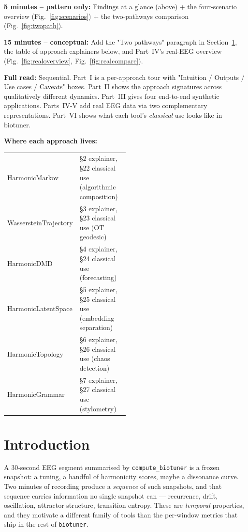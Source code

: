 \documentclass[11pt,a4paper]{article}
\begin{document}
\begin{tcolorbox}[enhanced, breakable, colback=black!4, colframe=black!30,
                  sharp corners, fonttitle=\bfseries, title={Reading paths},
                  before skip=4pt, after skip=4pt]
\textbf{5 minutes -- pattern only:}  Findings at a glance (above) +
the four-scenario overview (Fig.~\ref{fig:scenarios}) +
the two-pathways comparison (Fig.~\ref{fig:twopath}).

\medskip
\textbf{15 minutes -- conceptual:}  Add the "Two pathways" paragraph
in Section~\ref{sec:intro}, the table of approach explainers below,
and Part~IV's real-EEG overview
(Fig.~\ref{fig:realoverview}, Fig.~\ref{fig:realcompare}).

\medskip
\textbf{Full read:}  Sequential. Part~I is a per-approach tour with
"Intuition / Outputs / Use cases / Caveats" boxes. Part~II shows the
approach signatures across qualitatively different dynamics. Part~III
gives four end-to-end synthetic applications. Parts~IV-V add real
EEG data via two complementary representations. Part~VI shows what
each tool's \emph{classical} use looks like in biotuner.

\medskip
\textbf{Where each approach lives:}
\begin{tabular}{@{}lp{0.5\linewidth}@{}}
HarmonicMarkov & \S2 explainer, \S22 classical use (algorithmic composition) \\
WassersteinTrajectory & \S3 explainer, \S23 classical use (OT geodesic) \\
HarmonicDMD & \S4 explainer, \S24 classical use (forecasting) \\
HarmonicLatentSpace & \S5 explainer, \S25 classical use (embedding separation) \\
HarmonicTopology & \S6 explainer, \S26 classical use (chaos detection) \\
HarmonicGrammar & \S7 explainer, \S27 classical use (stylometry) \\
\end{tabular}
\end{tcolorbox}

\bigskip

\section{Introduction}\label{sec:intro}

A 30-second EEG segment summarised by \texttt{compute\_biotuner} is a
frozen snapshot: a tuning, a handful of harmonicity scores, maybe a
dissonance curve. Two minutes of recording produce a \emph{sequence} of
such snapshots, and that sequence carries information no single snapshot
can --- recurrence, drift, oscillation, attractor structure, transition
entropy. These are \emph{temporal} properties, and they motivate a
different family of tools than the per-window metrics that ship in the
rest of \texttt{biotuner}.
\end{document}
